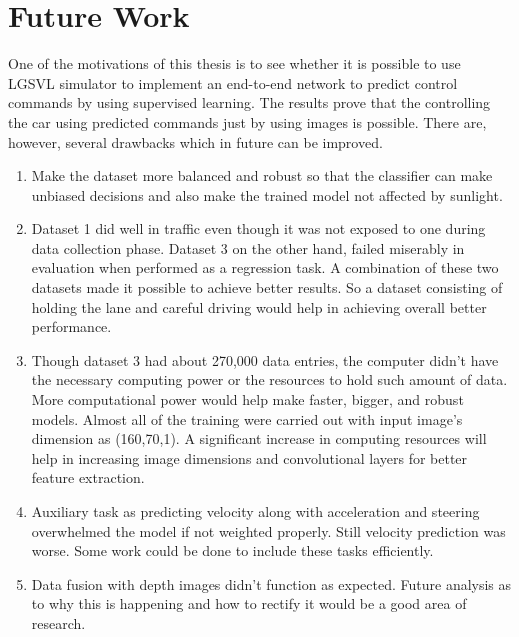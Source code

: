 \chapter{Future Work}
One of the motivations of this thesis is to see whether it is possible to use LGSVL
simulator to implement an end-to-end network to predict control commands by using
supervised learning. The results prove that the controlling the car using predicted
commands just by using images is possible. 
There are, however, several drawbacks which in future can be improved.
\begin{enumerate}
    \item Make the dataset more balanced and robust so that the classifier can make unbiased
        decisions and also make the trained model not affected by sunlight.
    \item Dataset 1 did well in traffic even though it was not exposed to one during data
        collection phase. Dataset 3 on the other hand, failed miserably in evaluation when
        performed as a regression task. A combination of these two datasets made it
        possible to achieve better results. So a dataset consisting of holding the lane
        and careful driving would help in achieving overall better performance.
    \item Though dataset 3 had about 270,000 data entries, the computer didn't have the
        necessary computing power or the resources to hold such amount of data. More
        computational power would help make faster, bigger, and robust models.  Almost all of the training were carried out with input image's dimension as (160,70,1). A significant increase in computing resources will help in increasing image dimensions and convolutional layers for better feature extraction.
    \item Auxiliary task as predicting velocity along with acceleration and steering
        overwhelmed the model if not weighted properly. Still velocity prediction was
        worse. Some work could be done to include these tasks efficiently.
    \item Data fusion with depth images didn't function as expected. Future analysis as to why this is happening and how to rectify it would be a good area of research.
\end{enumerate}

